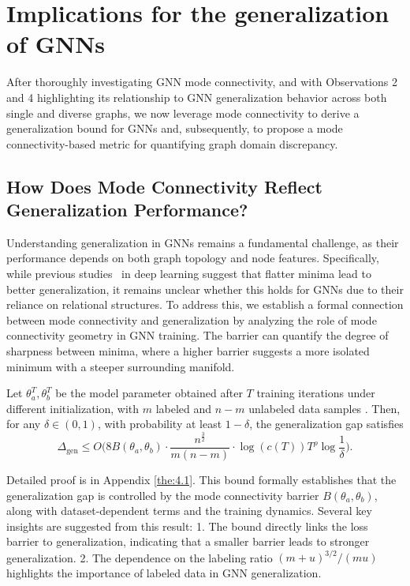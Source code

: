 \section{Implications for the generalization of GNNs}
\label{sec: general}

After thoroughly investigating GNN mode connectivity, and with Observations 2 and 4 highlighting its relationship to GNN generalization behavior across both single and diverse graphs, we now leverage mode connectivity to derive a generalization bound for GNNs and, subsequently, to propose a mode connectivity-based metric for quantifying graph domain discrepancy.


\subsection{How Does Mode Connectivity Reflect Generalization Performance?}
Understanding generalization in GNNs remains a fundamental challenge, as their performance depends on both graph topology and node features. Specifically, while previous studies~\cite{keskar2016large,tatro2020optimizing,juneja2022linear} in deep learning suggest that flatter minima lead to better generalization, it remains unclear whether this holds for GNNs due to their reliance on relational structures. To address this, we establish a formal connection between mode connectivity and generalization by analyzing the role of mode connectivity geometry in GNN training. The barrier can quantify the degree of sharpness between minima, where a higher barrier suggests a more isolated minimum with a steeper surrounding manifold.

\begin{theorem}  
\label{thm:generalization-barrier}  
 Let \(\theta^T_a,\theta^T_b\) be the model parameter obtained after \(T\) training iterations under different initialization, with \(m\) labeled and \(n-m\) unlabeled data samples . Then, for any \(\delta \in (0,1)\), with probability at least \(1 - \delta\), the generalization gap satisfies  
\begin{equation}
\Delta_{\text{gen}} \leq O \bigg( 8 B(\theta_a, \theta_b)\cdot \frac{n^{\frac{3}{2}}}{m(n-m)} \cdot \log(c(T)) T^\rho \log \frac{1}{\delta} \bigg).
\end{equation}
\end{theorem}
Detailed proof is in Appendix \ref{the:4.1}.
This bound formally establishes that the generalization gap is controlled by the mode connectivity barrier \( B(\theta_a, \theta_b) \), along with dataset-dependent terms and the training dynamics. Several key insights are suggested from this result:
1. The bound directly links the loss barrier to generalization, indicating that a smaller barrier leads to stronger generalization. 2. The dependence on the labeling ratio \( (m+u)^{3/2} / (mu) \) highlights the importance of labeled data in GNN generalization.

